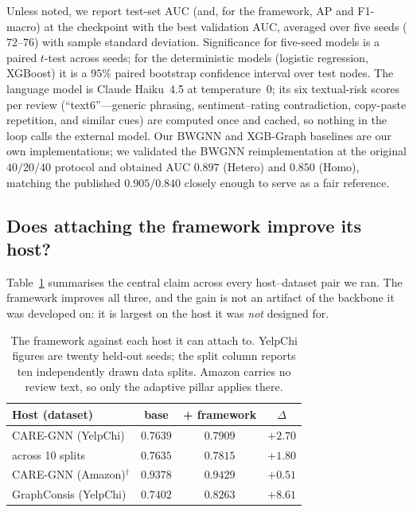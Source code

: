 \documentclass{conf}
\begin{document}
Unless noted, we report test-set AUC (and, for the framework, AP and F1-macro) at
the checkpoint with the best validation AUC, averaged over five seeds
($72$--$76$) with sample standard deviation. Significance for five-seed models is
a paired $t$-test across seeds; for the deterministic models (logistic
regression, XGBoost) it is a $95\%$ paired bootstrap confidence interval over
test nodes. The language model is Claude Haiku~4.5 at temperature~0; its six
textual-risk scores per review (``text6''---generic phrasing, sentiment--rating
contradiction, copy-paste repetition, and similar cues) are computed once and
cached, so nothing in the loop calls the external model. Our BWGNN and XGB-Graph
baselines are our own implementations; we validated the BWGNN reimplementation at
the original $40/20/40$ protocol and obtained AUC $0.897$ (Hetero) and $0.850$
(Homo), matching the published $0.905$/$0.840$ \cite{tang2022bwgnn} closely enough
to serve as a fair reference.

\subsection{Does attaching the framework improve its host?}
\label{sec:wrapper}

Table~\ref{tab:hosts} summarises the central claim across every host--dataset
pair we ran. The framework improves all three, and the gain is not an artifact
of the backbone it was developed on: it is largest on the host it was
\emph{not} designed for.

\begin{table}[H]
\centering
\footnotesize
\setlength{\tabcolsep}{4pt}
\caption{The framework against each host it can attach to. YelpChi figures are
twenty held-out seeds; the split column reports ten independently drawn data
splits. Amazon carries no review text, so only the adaptive pillar applies
there.}
\label{tab:hosts}
\begin{tabularx}{\linewidth}{@{}Xccc@{}}
\toprule
Host (dataset) & base & + framework & $\Delta$ \\
\midrule
CARE-GNN (YelpChi)   & $0.7639$ & $0.7909$ & $+2.70$ \\
\quad across 10 splits & $0.7635$ & $0.7815$ & $+1.80$ \\
CARE-GNN (Amazon)$^{\dagger}$ & $0.9378$ & $0.9429$ & $+0.51$ \\
GraphConsis (YelpChi) & $0.7402$ & $\mathbf{0.8263}$ & $\mathbf{+8.61}$ \\
\bottomrule
\end{tabularx}
\end{table}
\end{document}
